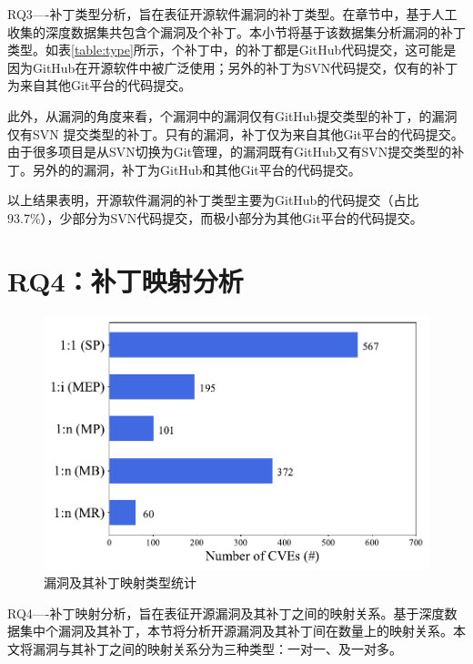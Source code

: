 RQ3----补丁类型分析，旨在表征开源软件漏洞的补丁类型。在章节\tocheck{\ref{sec:preparation}}中，基于人工收集的深度数据集共包含个漏洞及个补丁。本小节将基于该数据集分析漏洞的补丁类型。如表\ref{table:type}所示，个补丁中，的补丁都是GitHub代码提交，这可能是因为GitHub在开源软件中被广泛使用；另外的补丁为SVN代码提交，仅有的补丁为来自其他Git平台的代码提交。

此外，从漏洞的角度来看，个漏洞中的漏洞仅有GitHub提交类型的补丁，的漏洞仅有SVN 提交类型的补丁。只有的漏洞，补丁仅为来自其他Git平台的代码提交。由于很多项目是从SVN切换为Git管理，的漏洞既有GitHub又有SVN提交类型的补丁。另外的的漏洞，补丁为GitHub和其他Git平台的代码提交。

以上结果表明，开源软件漏洞的补丁类型主要为GitHub的代码提交（占比93.7\%），少部分为SVN代码提交，而极小部分为其他Git平台的代码提交。

\section{RQ4：补丁映射分析}\label{sec:cardinality}
\begin{figure}[h]
\centering
\includegraphics[scale=0.68]{fig/rq4-cardinality.pdf}
\vspace{-10pt}
\caption{漏洞及其补丁映射类型统计}\label{fig:rq4-cardinality}
\end{figure}

RQ4----补丁映射分析，旨在表征开源漏洞及其补丁之间的映射关系。基于深度数据集中个漏洞及其补丁，本节将分析开源漏洞及其补丁间在数量上的映射关系。本文将漏洞与其补丁之间的映射关系分为三种类型：一对一、及一对多。


